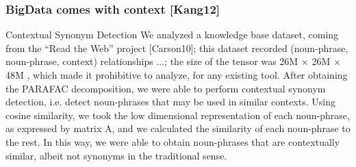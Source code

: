 \begin{frame}[plain]
	\frametitle{BigData comes with context [Kang12]}
	\begin{block}{Contextual Synonym Detection}
    We analyzed a knowledge base dataset, coming from the ``Read the
    Web'' project [Carson10]; this dataset recorded (noun-phrase, noun-phrase,
    context) relationships ...; the size of
    the tensor was 26M $\times$ 26M $\times$ 48M , which made it
    prohibitive to analyze, for any existing tool. After obtaining the
    PARAFAC decomposition, we 
    were able to perform contextual synonym detection, i.e. detect
    noun-phrases that may be used in similar contexts. Using cosine
    similarity, we took the low dimensional representation of each
    noun-phrase, as expressed by matrix A, and we calculated the
    similarity of each    noun-phrase to the rest. In this way, we
    were able to obtain noun-phrases that are contextually similar,
    albeit not synonyms in the 
    traditional sense. 
	\end{block}
	\begin{block}{}
	\end{block}
\end{frame}
